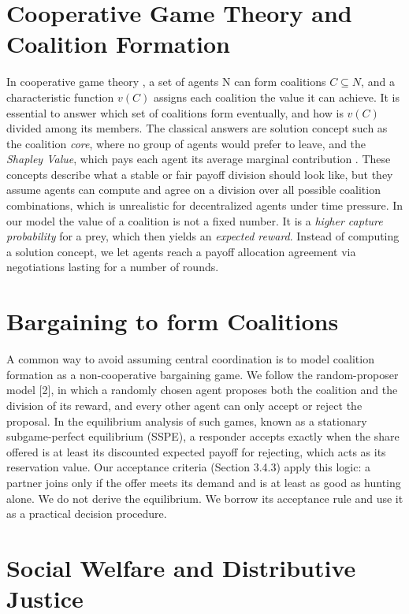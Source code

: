 \documentclass[12pt,a4paper]{report}
\begin{document}
	\section{Cooperative Game Theory and Coalition Formation}
	
	In cooperative game theory \cite{Chalkiadakis2011}, a set of agents N can form coalitions $C \subseteq N$, and a characteristic function $v(C)$ assigns each coalition the value it can achieve. It is essential to answer which set of coalitions form eventually, and how is $v(C)$ divided among its members. The classical answers are solution concept such as the coalition \textit{core}, where no group of agents would prefer to leave, and the \textit{Shapley Value}, which pays each agent its average marginal contribution \cite{Chalkiadakis2011}. These concepts describe what a stable or fair payoff division should look like, but they assume agents can compute and agree on a division over all possible coalition combinations, which is unrealistic for decentralized agents under time pressure. In our model the value of a coalition is not a fixed number. It is a \textit{higher capture probability} for a prey, which then yields an \textit{expected reward}. Instead of computing a solution concept, we let agents reach a payoff allocation agreement via negotiations lasting for a number of rounds.

	\section{Bargaining to form Coalitions}

	A common way to avoid assuming central coordination is to model coalition formation as a non-cooperative bargaining game. We follow the random-proposer model [2], in which a randomly chosen agent proposes both the coalition and the division of its reward, and every other agent can only accept or reject the proposal. In the equilibrium analysis of such games, known as a stationary subgame-perfect equilibrium (SSPE), a responder accepts exactly when the share offered is at least its discounted expected payoff for rejecting, which acts as its reservation value. Our acceptance criteria (Section 3.4.3) apply this logic: a partner joins only if the offer meets its demand and is at least as good as hunting alone. We do not derive the equilibrium. We borrow its acceptance rule and use it as a practical decision procedure. \\
	
	\section{Social Welfare and Distributive Justice}
\end{document}
